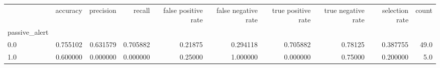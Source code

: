 \begin{tabular}{lrrrrrrrrr}
\toprule
{} &  accuracy &  precision &    recall &  false positive rate &  false negative rate &  true positive rate &  true negative rate &  selection rate &  count \\
passive\_alert &           &            &           &                      &                      &                     &                     &                 &        \\
\midrule
0.0           &  0.755102 &   0.631579 &  0.705882 &              0.21875 &             0.294118 &            0.705882 &             0.78125 &        0.387755 &   49.0 \\
1.0           &  0.600000 &   0.000000 &  0.000000 &              0.25000 &             1.000000 &            0.000000 &             0.75000 &        0.200000 &    5.0 \\
\bottomrule
\end{tabular}
